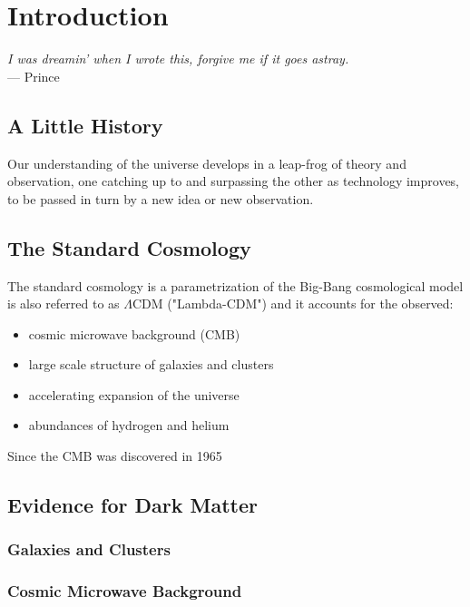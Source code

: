 \chapter{Introduction}\label{ch:introduction} %
\begin{flushright}{\slshape    
    I was dreamin' when I wrote this, forgive me if it goes astray. } \\ \medskip
    --- {Prince}
\end{flushright}


\section{A Little History}
Our understanding of the universe develops in a leap-frog of theory and observation, one catching up to and surpassing the other as technology improves, to be passed in turn by a new idea or new observation. 


\section{The Standard Cosmology}
The standard cosmology is a parametrization of the Big-Bang cosmological model is also referred to as $\Lambda$CDM ("Lambda-CDM") and it accounts for the observed:

\begin{itemize}
\item cosmic microwave background (CMB)
\item large scale structure of galaxies and clusters
\item accelerating expansion of the universe
\item abundances of hydrogen and helium
\end{itemize}

Since the CMB was discovered in 1965 

\section{Evidence for Dark Matter}
\subsection{Galaxies and Clusters}
\subsection{Cosmic Microwave Background}

